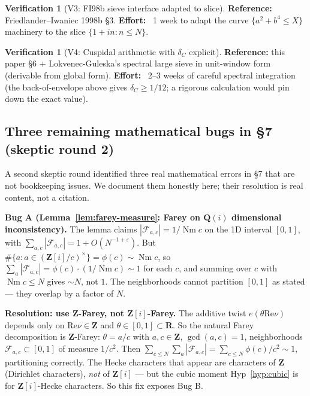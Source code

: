 \documentclass[11pt]{article}
\theoremstyle{definition}
\newtheorem{verification}[theorem]{Verification}
\newcommand{\Z}{\mathbf{Z}}
\newcommand{\Q}{\mathbf{Q}}
\newcommand{\R}{\mathbf{R}}
\newcommand{\Zi}{\Z[i]}
\newcommand{\Qi}{\Q(i)}
\renewcommand{\Re}{\mathrm{Re}}
\DeclareMathOperator{\Nm}{Nm}
\begin{document}
\begin{verification}[V3: FI98b sieve interface adapted to slice]\label{ver:V3-final}
\textbf{Reference:} Friedlander--Iwaniec 1998b §3. \textbf{Effort:} ~1 week to adapt the curve $\{a^2+b^4\le X\}$ machinery to the slice $\{1+in:n\le N\}$.
\end{verification}

\begin{verification}[V4: Cuspidal arithmetic with $\delta_C$ explicit]\label{ver:V4-final}
\textbf{Reference:} this paper §6 + Lokvenec-Guleska's spectral large sieve in unit-window form (derivable from global form). \textbf{Effort:} ~2--3 weeks of careful spectral integration (the back-of-envelope above gives $\delta_C\ge 1/12$; a rigorous calculation would pin down the exact value).
\end{verification}

\subsection*{Three remaining mathematical bugs in §7 (skeptic round 2)}

A second skeptic round identified three real mathematical errors in §7 that are not bookkeeping issues. We document them honestly here; their resolution is real content, not a citation.

\textbf{Bug A (Lemma~\ref{lem:farey-measure}: Farey on $\Qi$ dimensional inconsistency).}
The lemma claims $|\mathcal F_{a,c}|=1/\Nm c$ on the 1D interval $[0,1]$, with $\sum_{a,c}|\mathcal F_{a,c}|=1+O(N^{-1+\varepsilon})$. But $\#\{a:a\in(\Zi/c)^\times\}=\phi(c)\sim\Nm c$, so $\sum_a|\mathcal F_{a,c}|=\phi(c)\cdot(1/\Nm c)\sim 1$ for each $c$, and summing over $c$ with $\Nm c\le N$ gives $\sim N$, not $1$. The neighborhoods cannot partition $[0,1]$ as stated — they overlap by a factor of $N$.

\textbf{Resolution: use $\Z$-Farey, not $\Zi$-Farey.} The additive twist $e(\theta\Re\nu)$ depends only on $\Re\nu\in\Z$ and $\theta\in[0,1]\subset\R$. So the natural Farey decomposition is $\Z$-Farey: $\theta=a/c$ with $a,c\in\Z$, $\gcd(a,c)=1$, neighborhoods $\mathcal F_{a,c}\subset[0,1]$ of measure $1/c^2$. Then $\sum_{c\le N}\sum_a|\mathcal F_{a,c}|=\sum_{c\le N}\phi(c)/c^2\sim 1$, partitioning correctly. The Hecke characters that appear are characters of $\Z$ (Dirichlet characters), \emph{not} of $\Zi$ — but the cubic moment Hyp~\ref{hyp:cubic} is for $\Zi$-Hecke characters. So this fix exposes Bug B.
\end{document}
